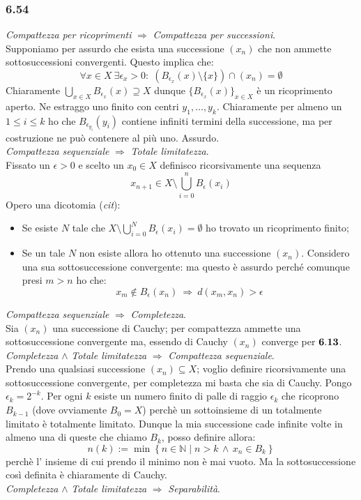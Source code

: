 \documentclass[a4paper,11pt]{article}
\newcommand{\ex}[1]{\subsubsection*{#1}}
\newcommand{\NN}{\mathbb{N}}
\newcommand{\rec}[1]{{\bf #1}}
\begin{document}
\ex{6.54} {\it Compattezza per ricoprimenti} $\Rightarrow$ {\it Compattezza per successioni}. \\
Supponiamo per assurdo che esista una successione $(x_n)$ che non ammette sottosuccessioni convergenti. Questo implica che:
$$ \forall x\in X\  \exists \epsilon_x > 0: \; \left( B_{\epsilon_x}(x)\setminus \{x\}\right) \cap (x_n) = \emptyset $$
Chiaramente $\bigcup_{x\in X}B_{\epsilon_x}(x)\supseteq X$ dunque $\{B_{\epsilon_x}(x)\}_{x\in X}$ è un ricoprimento aperto. Ne estraggo uno finito con centri $y_1,\ldots,y_k$. Chiaramente per almeno un $1\leq i\leq k$ ho che $B_{\epsilon_{y_i}}(y_i)$ contiene infiniti termini della successione, ma per costruzione ne può contenere al più uno. Assurdo.\\
{\it Compattezza sequenziale} $\Rightarrow$ {\it Totale limitatezza}.\\
Fissato un $\epsilon > 0$ e scelto un $x_0 \in X$ definisco ricorsivamente una sequenza 
$$x_{n+1} \in X \setminus \bigcup_{i=0}^{n}B_\epsilon(x_i)$$
Opero una dicotomia ({\it cit}):
\begin{itemize}
\item Se esiste $N$ tale che $X \setminus \bigcup_{i=0}^{N}B_\epsilon(x_i) = \emptyset $ ho trovato un ricoprimento finito;
\item Se un tale $N$ non esiste allora ho ottenuto una successione $(x_n)$. Considero una sua sottosuccessione convergente: ma questo è assurdo perché comunque presi $m>n$ ho che:
$$
x_m\notin B_{\epsilon}(x_n)\ \Rightarrow\ d(x_m,x_n)>\epsilon
$$
\end{itemize}
{\it Compattezza sequenziale} $\Rightarrow$ {\it Completezza}.\\
Sia $(x_n)$ una successione di Cauchy; per compattezza ammette una sottosuccessione convergente ma, essendo di Cauchy $(x_n)$ converge per $\rec{6.13}$.\\
{\it Completezza} $\wedge$ {\it Totale limitatezza} $\Rightarrow$ {\it Compattezza sequenziale}.\\
Prendo una qualsiasi successione $(x_n)\subseteq X$; voglio definire ricorsivamente una sottosuccessione convergente, per completezza mi basta che sia di Cauchy. Pongo $\epsilon_k=2^{-k}$. Per ogni $k$ esiste un numero finito di palle di raggio $\epsilon_k$ che ricoprono $B_{k-1}$ (dove ovviamente $B_0=X$) perchè un sottoinsieme di un totalmente limitato è totalmente limitato. Dunque la mia successione cade infinite volte in almeno una di queste che chiamo $B_k$, posso definire allora:
$$
n(k):=\min\left\{n\in\NN\mid n>k\, \wedge\, x_n\in B_k\right\}
$$ 
perchè l' insieme di cui prendo il minimo non è mai vuoto. Ma la sottosuccessione così definita è chiaramente di Cauchy.\\
{\it Completezza} $\wedge$ {\it Totale limitatezza} $\Rightarrow$ {\it Separabilità}.\\
\end{document}

